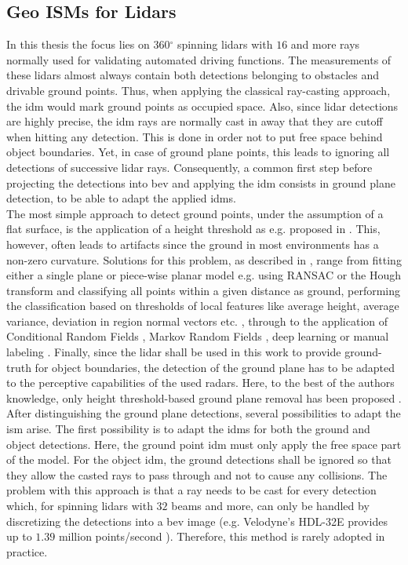 \subsection{Geo ISMs for Lidars}
\label{subsec:geo_ism_lidar}
In this thesis the focus lies on 360$^\circ$ spinning lidars with $16$ and more rays normally used for validating automated driving functions. The measurements of these lidars almost always contain both detections belonging to obstacles and drivable ground points. Thus, when applying the classical ray-casting approach, the \gls{idm} would mark ground points as occupied space. Also, since lidar detections are highly precise, the \gls{idm} rays are normally cast in away that they are cutoff when hitting any detection. This is done in order not to put free space behind object boundaries. Yet, in case of ground plane points, this leads to ignoring all detections of successive lidar rays. Consequently, a common first step before projecting the detections into \gls{bev} and applying the \gls{idm} consists in ground plane detection, to be able to adapt the applied \gls{idm}s. 
\\
The most simple approach to detect ground points, under the assumption of a flat surface, is the application of a height threshold as e.g. proposed in \cite{thrun2006stanley}. This, however, often leads to artifacts since the ground in most environments has a non-zero curvature. Solutions for this problem, as described in \cite{narksri2018slope}, range from fitting either a single plane or piece-wise planar model e.g. using RANSAC or the Hough transform \cite{fischler1981random,hough1962method,oliveira2016scene,tian2020fast} and classifying all points within a given distance as ground, performing the classification based on thresholds of local features like average height, average variance, deviation in region normal vectors etc. \cite{li2014motion,asvadi2015detection}, through to the application of Conditional Random Fields \cite{rummelhard2017ground}, Markov Random Fields \cite{guo2011graph}, deep learning or manual labeling \cite{velas2018cnn}. Finally, since the lidar shall be used in this work to provide ground-truth for object boundaries, the detection of the ground plane has to be adapted to the perceptive capabilities of the used radars. Here, to the best of the authors knowledge, only height threshold-based ground plane removal has been proposed \cite{weston2019probably,sless2019road}.
\\
After distinguishing the ground plane detections, several possibilities to adapt the \gls{ism} arise. The first possibility is to adapt the \gls{idm}s for both the ground and object detections. Here, the ground point \gls{idm} must only apply the free space part of the model. For the object \gls{idm}, the ground detections shall be ignored so that they allow the casted rays to pass through and not to cause any collisions. The problem with this approach is that a ray needs to be cast for every detection which, for spinning lidars with $32$ beams and more, can only be handled by discretizing the detections into a \gls{bev} image (e.g. Velodyne's HDL-32E provides up to $1.39$ million points/second \cite{VelHDL32}). Therefore, this method is rarely adopted in practice.
